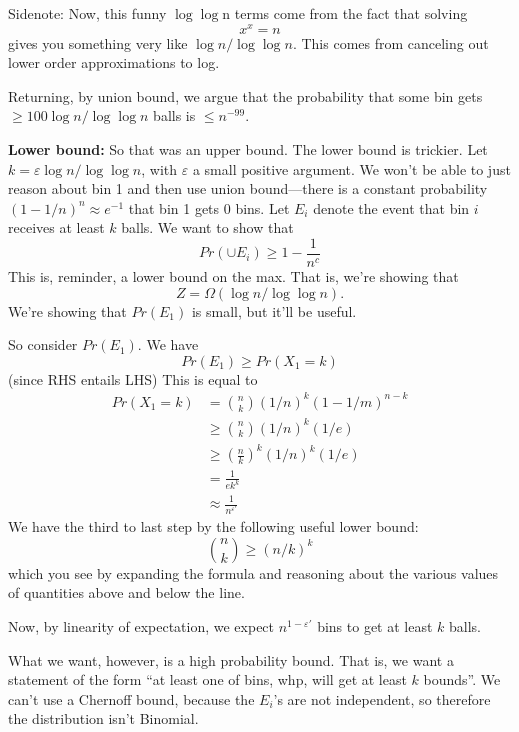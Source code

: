 \documentclass{article}
\begin{document}
Sidenote:
Now, this funny $\log\log $n terms come from the fact that solving
$$
x^x = n
$$
gives you something very like $\log n / \log\log n$.
This comes from canceling out lower order approximations to log.

Returning, by union bound, we argue that the probability that some bin gets $\geq 100 \log n / \log\log n$ balls is $\leq n^{-99}$.

\textbf{Lower bound:}
So that was an upper bound. The lower bound is trickier.
Let $k = \varepsilon \log n / \log\log n$, with $\varepsilon$ a small positive argument.
We won't be able to just reason about bin 1 and then use union bound---there is a constant probability $(1 - 1/n)^n \approx e^{-1}$ that bin 1 gets 0 bins.
Let $E_i$ denote the event that bin $i$ receives at least $k$ balls.
We want to show that
$$
Pr(\cup E_i) \geq 1 - \frac{1}{n^c}
$$
This is, reminder, a lower bound on the max.
That is, we're showing that
$$
Z = \Omega(\log n / \log\log n).
$$
We're showing that $Pr(E_1)$ is small, but it'll be useful.

So consider $Pr(E_1)$.
We have
$$
Pr(E_1) \geq Pr(X_1 = k)
$$
(since RHS entails LHS)
This is equal to 
\begin{align}
Pr(X_1 = k)
&= {n \choose k} 
\left(1/n \right)^k
(1 - 1/m)^{n-k}
\\
&\geq
{n\choose k} (1/n)^k
(1/e)
\\
&\geq \left(
	\frac{n}{k}
\right)^k
(1/n)^k
(1/e)
\\
&=
\frac{1}{e k^k}
\\
&\approx \frac{1}{n^{\varepsilon'}}
\end{align}
We have the third to last step by the following useful lower bound:
$$
{n\choose k} \geq (n/k)^k
$$
which you see by expanding the formula and reasoning about the various values of quantities above and below the line.

Now, by linearity of expectation, we expect
$n^{1-{\varepsilon'}}$ bins to get at least $k$ balls.

What we want, however, is a high probability bound.
That is, we want a statement of the form ``at least one of  bins, whp, will get at least $k$ bounds''.
We can't use a Chernoff bound, because the $E_i$'s are not independent, so therefore the distribution isn't Binomial.
\end{document}
